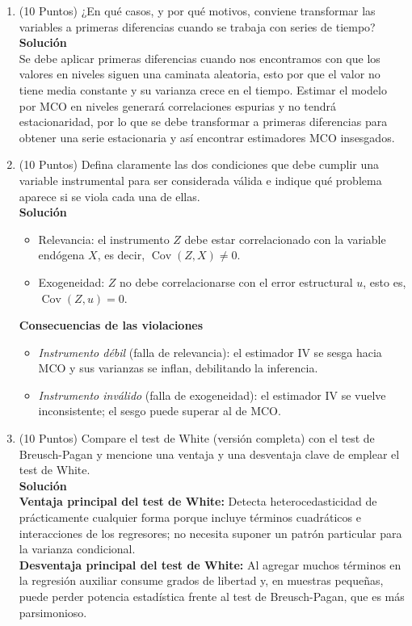 \documentclass[10pt,a4paper]{article}
\begin{document}
\begin{enumerate}

\item (10 Puntos) ¿En qué casos, y por qué motivos, conviene transformar las variables a primeras diferencias cuando se trabaja con series de tiempo?
\\
\textbf{Solución}
\\
Se debe aplicar primeras diferencias cuando nos encontramos con que los valores en niveles siguen una caminata aleatoria, esto por que el valor no tiene media constante y su varianza crece en el tiempo. Estimar el modelo por MCO en niveles generará correlaciones espurias y no tendrá estacionaridad, por lo que se debe transformar a primeras diferencias para obtener una serie estacionaria y así encontrar estimadores MCO insesgados.

\item (10 Puntos) Defina claramente las dos condiciones que debe cumplir una variable instrumental para ser considerada válida e indique qué problema aparece si se viola cada una de ellas.  \\
\textbf{Solución} 
\\
\begin{itemize}
  \item {Relevancia}: el instrumento $Z$ debe estar correlacionado con la variable endógena $X$, 
        es decir, $\operatorname{Cov}(Z,X)\neq 0$.
  \item {Exogeneidad}: $Z$ no debe correlacionarse con el error 
        estructural $u$, esto es, $\operatorname{Cov}(Z,u)=0$.
\end{itemize}

\textbf{Consecuencias de las violaciones}
\begin{itemize}
  \item \emph{Instrumento débil} (falla de relevancia): el estimador IV se sesga hacia MCO y sus 
        varianzas se inflan, debilitando la inferencia.
  \item \emph{Instrumento inválido} (falla de exogeneidad): el estimador IV se vuelve inconsistente; 
        el sesgo puede superar al de MCO.
\end{itemize}

\item (10 Puntos) Compare el test de White (versión completa) con el test de Breusch-Pagan y mencione una ventaja y una desventaja clave de emplear el test de White.\\
\textbf{Solución}
\\
\textbf{Ventaja principal del test de White:}
Detecta heterocedasticidad de prácticamente cualquier forma porque incluye términos cuadráticos e interacciones de los regresores; no necesita suponer un patrón particular para la varianza condicional.
\\
\textbf{Desventaja principal del test de White:}
Al agregar muchos términos en la regresión auxiliar consume grados de libertad y, en muestras pequeñas, puede perder potencia estadística frente al test de Breusch-Pagan, que es más parsimonioso.

\end{enumerate}
\end{document}

